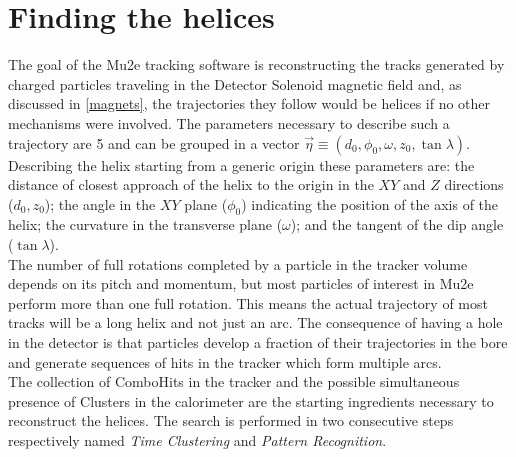 \documentclass[12pt,a4paper,openright, oneside, titlepage]{book} %
\begin{document}
\section{Finding the helices}
The goal of the Mu2e tracking software is reconstructing the tracks generated by charged particles traveling in the Detector Solenoid magnetic field and, as discussed in \ref{magnets}, 
the trajectories they follow would be helices if no other mechanisms were involved. 
The parameters necessary to describe such a trajectory are 5 and can be grouped in a vector ${\vec{\eta}} \equiv ( d_0, \phi_0, \omega, z_0, \tan \lambda)$. 
Describing the helix starting from a generic origin these parameters are: the distance of closest approach of the helix to the origin in the $XY$ and $Z$ directions ($d_0,z_0$); the angle in the $XY$ plane ($\phi_0$) indicating the position of the axis of the helix; the curvature in the transverse plane ($\omega$); and the tangent of the dip angle ($\tan\lambda$).\\
The number of full rotations completed by a particle in the tracker volume depends on its pitch and momentum, but most particles of interest in Mu2e perform more than one full rotation. 
This means the actual trajectory of most tracks will be a long helix and not just an arc. 
The consequence of having a hole in the detector is that particles develop a fraction of their trajectories in the bore and generate sequences of hits in the tracker which form multiple arcs.\\
The collection of ComboHits in the tracker and the possible simultaneous presence of Clusters in the calorimeter are the starting ingredients necessary to reconstruct the helices. 
The search is performed in two consecutive steps respectively named \textit{Time Clustering} and \textit{Pattern Recognition}.
\end{document}
